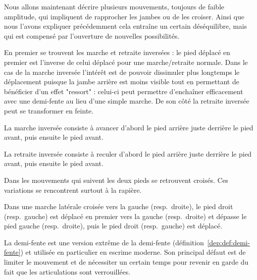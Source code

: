 Nous allons maintenant décrire plusieurs mouvements, toujours de faible amplitude, qui impliquent de rapprocher les jambes ou de les croiser.
Ainsi que nous l'avons expliquer précédemment cela entraîne un certain déséquilibre, mais qui est compensé par l'ouverture de nouvelles possibilités.

En premier se trouvent les marche et retraite inversées : le pied déplacé en premier est l'inverse de celui déplacé pour une marche/retraite normale.
Dans le cas de la marche inversée l'intérêt est de pouvoir dissimuler plus longtemps le déplacement puisque la jambe arrière est moins visible tout en permettant de bénéficier d'un effet "ressort" : celui-ci peut permettre d'enchaîner efficacement avec une demi-fente au lieu d'une simple marche.
De son côté la retraite inversée peut se transformer en feinte.


\begin{definition}

La marche inversée consiste à avancer d'abord le pied arrière juste derrière le pied avant, puis ensuite le pied avant.
\end{definition}


\begin{definition}

La retraite inversée consiste à reculer d'abord le pied arrière juste derrière le pied avant, puis ensuite le pied avant.
\end{definition}


Dans les mouvements qui suivent les deux pieds se retrouvent croisés.
Ces variations se rencontrent surtout à la rapière.

\begin{definition}

Dans une marche latérale croisée vers la gauche (resp.\ droite), le pied droit (resp.\ gauche) est déplacé en premier vers la gauche (resp.\ droite) et dépasse le pied gauche (resp.\ droite), puis le pied droit (resp.\ gauche) est déplacé.
\end{definition}


La demi-fente est une version extrême de la demi-fente (définition~\ref{dep:def:demi-fente}) et utilisée en particulier en escrime moderne.
Son principal défaut est de limiter le mouvement et de nécessiter un certain temps pour revenir en garde du fait que les articulations sont verrouillées.


